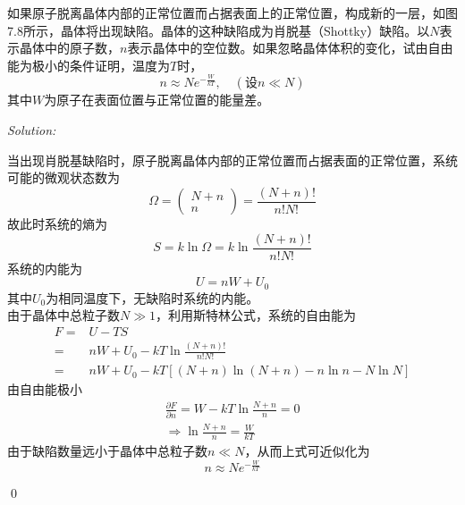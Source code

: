 \documentclass[12pt,a4paper]{article}
\newenvironment{problem}[2][Problem]{\begin{trivlist}
\item[\hskip \labelsep {\bfseries #1}\hskip \labelsep {\bfseries #2.}]}{\end{trivlist}}
\newenvironment{sol}
    {\emph{Solution:}
    }
    {
    \qed
    }
\begin{document}
\begin{problem}{7.7}
如果原子脱离晶体内部的正常位置而占据表面上的正常位置，构成新的一层，如图7.8所示，晶体将出现缺陷。晶体的这种缺陷成为肖脱基（Shottky）缺陷。以$N$表示晶体中的原子数，$n$表示晶体中的空位数。如果忽略晶体体积的变化，试由自由能为极小的条件证明，温度为$T$时，
\[
n\approx Ne^{-\frac{W}{kT}},\quad(\text{设}n\ll N)
\]
其中$W$为原子在表面位置与正常位置的能量差。
\end{problem}
\begin{sol}
当出现肖脱基缺陷时，原子脱离晶体内部的正常位置而占据表面的正常位置，系统可能的微观状态数为
\begin{equation}
\Omega=\left(\begin{array}{c}N+n\\n\end{array}\right)=\frac{(N+n)!}{n!N!}
\end{equation}
故此时系统的熵为
\begin{equation}
S=k\ln\Omega=k\ln\frac{(N+n)!}{n!N!}
\end{equation}
系统的内能为
\begin{equation}
U=nW+U_0
\end{equation}
其中$U_0$为相同温度下，无缺陷时系统的内能。\\
由于晶体中总粒子数$N\gg1$，利用斯特林公式，系统的自由能为
\begin{align}
\nonumber F=&U-TS\\
\nonumber=&nW+U_0-kT\ln\frac{(N+n)!}{n!N!}\\
=&nW+U_0-kT[(N+n)\ln(N+n)-n\ln n-N\ln N]
\end{align}
由自由能极小
\begin{gather}
\frac{\partial F}{\partial n}=W-kT\ln\frac{N+n}{n}=0\\
\Longrightarrow\ln\frac{N+n}{n}=\frac{W}{kT}
\end{gather}
由于缺陷数量远小于晶体中总粒子数$n\ll N$，从而上式可近似化为
\begin{equation}
n\approx Ne^{-\frac{W}{kT}}
\end{equation}
\end{sol}
\end{document}
